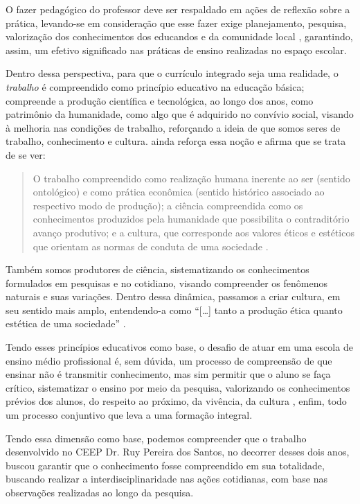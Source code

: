 \begin{refsection}
    O fazer pedagógico do professor deve ser respaldado em ações de reflexão sobre a prática, levando-se em consideração que esse fazer exige planejamento, pesquisa, valorização dos conhecimentos dos educandos e da comunidade local \cite{FREIRE1996Pedagogia}, garantindo, assim, um efetivo significado nas práticas de ensino realizadas no espaço escolar.  

    Dentro dessa perspectiva, para que o currículo integrado seja uma realidade, o \textit{trabalho} é compreendido como princípio educativo na educação básica; compreende a produção científica e tecnológica, ao longo dos anos, como patrimônio da humanidade, como algo que é adquirido no convívio social, visando à melhoria nas condições de trabalho, reforçando a ideia de que somos seres de trabalho, conhecimento e cultura. \textcite{RAMOS2008Concepção} ainda reforça essa noção e afirma que se trata de se ver: 

    \begin{quotation}
        O trabalho compreendido como realização humana inerente ao ser (sentido ontológico) e como prática econômica (sentido histórico associado ao respectivo modo de produção); a ciência compreendida como os conhecimentos produzidos pela humanidade que possibilita o contraditório avanço produtivo; e a cultura, que corresponde aos valores éticos e estéticos que orientam as normas de conduta de uma sociedade \cite[p.~3]{RAMOS2008Concepção}.
    \end{quotation}

    Também somos produtores de ciência, sistematizando os conhecimentos formulados em pesquisas e no cotidiano, visando compreender os fenômenos naturais e suas variações. Dentro dessa dinâmica, passamos a criar cultura, em seu sentido mais amplo, entendendo-a como “[\dots] tanto a produção ética quanto estética de uma sociedade” \cite[p.~7]{RAMOS2008Concepção}.

    Tendo esses princípios educativos como base, o desafio de atuar em uma escola de ensino médio profissional é, sem dúvida, um processo de compreensão de que ensinar não é transmitir conhecimento, mas sim permitir que o aluno se faça crítico, sistematizar o ensino por meio da pesquisa, valorizando os conhecimentos prévios dos alunos, do respeito ao próximo, da vivência, da cultura \cite{FREIRE1996Pedagogia}, enfim, todo um processo conjuntivo que leva a uma formação integral. 

    Tendo essa dimensão como base, podemos compreender que o trabalho desenvolvido no CEEP Dr. Ruy Pereira dos Santos, no decorrer desses dois anos, buscou garantir que o conhecimento fosse compreendido em sua totalidade, buscando realizar a interdisciplinaridade nas ações cotidianas, com base nas observações realizadas ao longo da pesquisa. 


\end{refsection}
